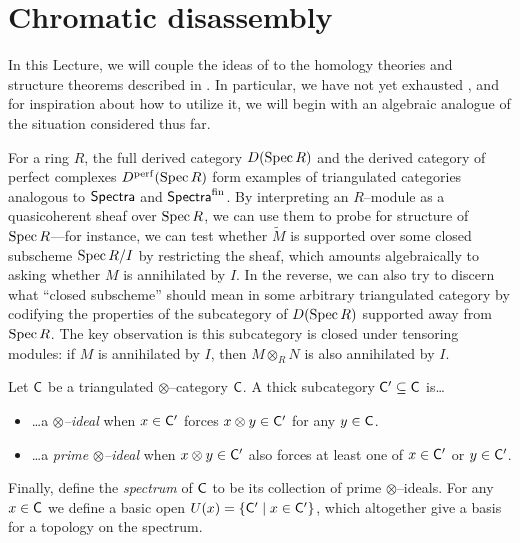 \section{Chromatic disassembly}\label{ChromaticLocalizationSection}

In this Lecture, we will couple the ideas of  to the homology theories and structure theorems described in .  In particular, we have not yet exhausted , and for inspiration about how to utilize it, we will begin with an algebraic analogue of the situation considered thus far.

For a ring $R$, the full derived category $D(\operatorname{Spec} R)$ and the derived category of perfect complexes $D^{\mathrm{perf}}(\operatorname{Spec} R)$ form examples of triangulated categories analogous to $\mathsf{Spectra}$ and $\mathsf{Spectra}^{\mathrm{fin}}$.  By interpreting an $R$--module as a quasicoherent sheaf over $\operatorname{Spec} R$, we can use them to probe for structure of $\operatorname{Spec} R$---for instance, we can test whether $\widetilde M$ is supported over some closed subscheme $\operatorname{Spec} R/I$ by restricting the sheaf, which amounts algebraically to asking whether $M$ is annihilated by $I$.  In the reverse, we can also try to discern what ``closed subscheme'' should mean in some arbitrary triangulated category by codifying the properties of the subcategory of $D(\operatorname{Spec} R)$ supported away from $\operatorname{Spec} R$.  The key observation is this subcategory is closed under tensoring modules: if $M$ is annihilated by $I$, then $M \otimes_R N$ is also annihilated by $I$.

\begin{definition}
Let $\mathsf{C}$ be a triangulated $\otimes$--category $\mathsf{C}$.  A thick subcategory $\mathsf{C}' \subseteq \mathsf{C}$ is\ldots
\begin{itemize}
\item \ldots a \textit{$\otimes$--ideal} when $x \in \mathsf{C}'$ forces $x \otimes y \in \mathsf{C}'$ for any $y \in \mathsf{C}$.
\item \ldots a \textit{prime $\otimes$--ideal} when $x \otimes y \in \mathsf{C}'$ also forces at least one of $x \in \mathsf{C}'$ or $y \in \mathsf{C}'$.
\end{itemize}
Finally, define the \textit{spectrum} of $\mathsf{C}$ to be its collection of prime $\otimes$--ideals.  For any $x \in \mathsf{C}$ we define a basic open $U(x) = \{\mathsf{C}' \mid x \in \mathsf{C}'\}$, which altogether give a basis for a topology on the spectrum.
\end{definition}

